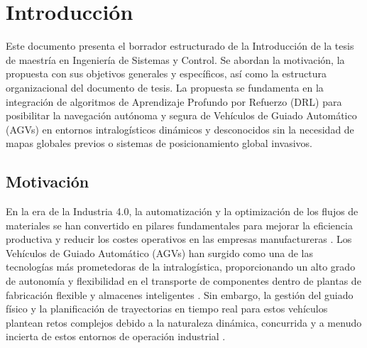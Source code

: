\chapter{Introducción}\label{chap:introduccion}



Este documento presenta el borrador estructurado de la Introducción de la tesis de maestría en Ingeniería de Sistemas y Control. Se abordan la motivación, la propuesta con sus objetivos generales y específicos, así como la estructura organizacional del documento de tesis. La propuesta se fundamenta en la integración de algoritmos de Aprendizaje Profundo por Refuerzo (DRL) para posibilitar la navegación autónoma y segura de Vehículos de Guiado Automático (AGVs) en entornos intralogísticos dinámicos y desconocidos sin la necesidad de mapas globales previos o sistemas de posicionamiento global invasivos.


\newpage

\section{Motivación}

En la era de la Industria 4.0, la automatización y la optimización de los flujos de materiales se han convertido en pilares fundamentales para mejorar la eficiencia productiva y reducir los costes operativos en las empresas manufactureras \cite{Hu2020}. Los Vehículos de Guiado Automático (AGVs) han surgido como una de las tecnologías más prometedoras de la intralogística, proporcionando un alto grado de autonomía y flexibilidad en el transporte de componentes dentro de plantas de fabricación flexible y almacenes inteligentes \cite{Hu2020, Ye2023}. Sin embargo, la gestión del guiado físico y la planificación de trayectorias en tiempo real para estos vehículos plantean retos complejos debido a la naturaleza dinámica, concurrida y a menudo incierta de estos entornos de operación industrial \cite{Hu2020, Ye2023, Xue2022}.

